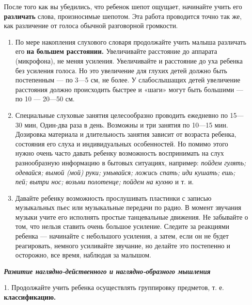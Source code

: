 \documentclass[a5paper]{book}
\renewcommand{\emph}[1]{\textit{#1}}
\begin{document}
После того как вы убедились, что ребенок шепот ощущает, начинайте учить
его \textbf{различать} слова, произносимые шепотом. Эта работа
проводится точно так же, как различение от голоса обычной разговорной
громкости.


\begin{enumerate}
\def\labelenumi{\arabic{enumi}.}
\setcounter{enumi}{5}
\item
  
  По мере накопления слухового словаря продолжайте учить малыша
  различать его \textbf{на большем расстоянии.} Увеличивайте расстояние
  до аппарата (микрофона), не меняя усиления. Увеличивайте и расстояние
  до уха ребенка без усиления голоса. Но это увеличение для глухих детей
  должно быть постепенным --- по 3---5 см, не более. У слабослышащих
  детей увеличение расстояния должно происходить быстрее и «шаги» могут
  быть большими --- по 10 --- 20---50 см.
  
\item
  
  Специальные слуховые занятия целесообразно проводить ежедневно по
  15---30 мин, Один-два раза в день. Возможны и три занятия по 10---15
  мин. Дозировка материала и длительность занятия зависит от возраста
  ребенка, состояния его слуха и индивидуальных особенностей. Но помимо
  этого нужно очень часто давать ребенку возможность воспринимать на
  слух разнообразную информацию в бытовых ситуациях, например:
  \emph{пойдем гулять; одевайся; вымой (мой) руки; умывайся; ложись
  спать; иди кушать; ешь; пей; вытри нос; возьми полотенце; пойдем на
  кухню} и т. и.
  
\item
  
  Давайте ребенку возможность прослушивать пластинки с записью
  музыкальных пьес или музыкальные передачи по радио. В момент звучания
  музыки учите его исполнять простые танцевальные движения. Не забывайте
  о том, что нельзя ставить очень большое усиление. Следите за реакциями
  ребенка --- начинайте с небольшого усиления, а затем, если он не будет
  реагировать, немного усиливайте звучание, но делайте это постепенно и
  осторожно, все время, наблюдая за малышом.
  
\end{enumerate}


\emph{\textbf{Развитие наглядно-действенного и наглядно-образного
мышления}}

1. Продолжайте учить ребенка осуществлять группировку предметов, т. е.
\textbf{классификацию.}
\end{document}
